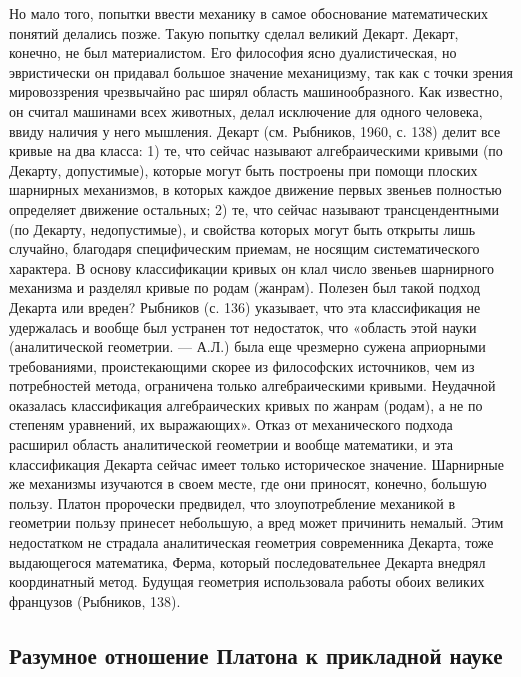 Но   мало  того,   попытки   ввести  механику   в  самое   обоснование
математических понятий  делались позже.  Такую попытку  сделал великий
Декарт.  Декарт,   конечно,  не   был  материалистом.   Его  философия
ясно  дуалистическая, но  эвристически  он  придавал большое  значение
механицизму,  так как  с  точки зрения  мировоззрения чрезвычайно  рас
ширял  область  машинообразного.  Как  известно,  он  считал  машинами
всех  животных, делал  исключение для  одного человека,  ввиду наличия
у  него  мышления. Декарт  (см.  Рыбников,  1960,  с. 138)  делит  все
кривые  на два  класса:  1) те,  что  сейчас называют  алгебраическими
кривыми  (по Декарту,  допустимые), которые  могут быть  построены при
помощи  плоских  шарнирных  механизмов,   в  которых  каждое  движение
первых  звеньев  полностью  определяет   движение  остальных;  2)  те,
что  сейчас  называют  трансцендентными  (по  Декарту,  недопустимые),
и  свойства  которых  могут  быть  открыты  лишь  случайно,  благодаря
специфическим  приемам,  не   носящим  систематического  характера.  В
основу  классификации   кривых  он   клал  число   звеньев  шарнирного
механизма  и разделял  кривые  по родам  (жанрам).  Полезен был  такой
подход  Декарта  или вреден?  Рыбников  (с.  136) указывает,  что  эта
классификация  не удержалась  и  вообще был  устранен тот  недостаток,
что  «область  этой науки  (аналитической  геометрии.  --- А.Л.)  была
еще  чрезмерно сужена  априорными требованиями,  проистекающими скорее
из  философских источников,  чем  из  потребностей метода,  ограничена
только  алгебраическими  кривыми.  Неудачной  оказалась  классификация
алгебраических кривых по  жанрам (родам), а не  по степеням уравнений,
их  выражающих».  Отказ  от  механического  подхода  расширил  область
аналитической  геометрии  и  вообще математики,  и  эта  классификация
Декарта  сейчас  имеет  только  историческое  значение.  Шарнирные  же
механизмы изучаются в своем месте,  где они приносят, конечно, большую
пользу. Платон  пророчески предвидел, что злоупотребление  механикой в
геометрии пользу  принесет небольшую, а вред  может причинить немалый.
Этим  недостатком  не  страдала аналитическая  геометрия  современника
Декарта, тоже выдающегося  математика, Ферма, который последовательнее
Декарта  внедрял координатный  метод.  Будущая геометрия  использовала
работы обоих великих французов (Рыбников, 138).

\subsection{Разумное отношение Платона к прикладной науке}

